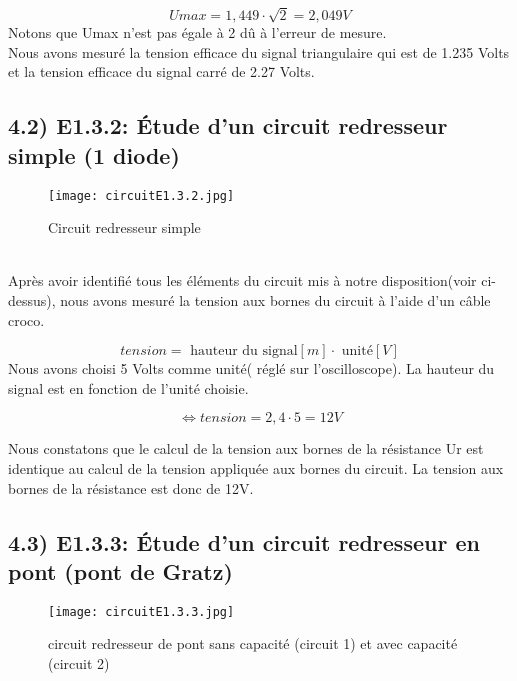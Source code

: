 \documentclass{report}
\begin{document}
\begin{equation}
   Umax = 1,449 \cdot \sqrt{2} = 2,049 V
\end{equation}
Notons que Umax n'est pas \'egale \`a 2 d\^u \`a l'erreur de mesure.
\\

Nous avons mesur\'e la tension efficace du signal triangulaire qui est de 1.235 Volts et la tension efficace du signal carr\'e de 2.27 Volts.

\subsection*{4.2) E1.3.2: \'Etude d'un circuit redresseur simple (1 diode)}
\hspace*{0.5cm}
\begin{figure}[ht!]
\centering
\texttt{[image: circuitE1.3.2.jpg]}
\caption{Circuit redresseur simple}
\label{overflow}
\end{figure}
\\
Apr\`es avoir identifi\'e tous les \'el\'ements du circuit mis \`a notre disposition(voir ci-dessus), nous avons mesur\'e la tension aux bornes du circuit \`a l'aide d'un c\^able croco.

\begin{equation}
   tension = \text{ hauteur du signal}[m] \cdot \text{ unit\'e}[V]
\end{equation}
Nous avons choisi 5 Volts comme unit\'e( r\'egl\'e sur l'oscilloscope). La hauteur du signal est en fonction de l'unit\'e choisie.

\begin{equation}
   \Leftrightarrow tension = 2,4 \cdot 5 = 12 V
\end{equation}

Nous constatons que le calcul de la tension aux bornes de la r\'esistance Ur est identique au calcul de la tension appliqu\'ee aux bornes du circuit. La tension aux bornes de la r\'esistance est donc de 12V.

\subsection*{4.3) E1.3.3: \'Etude d'un circuit redresseur en pont (pont de Gratz)}
\hspace*{0.5cm}
\begin{figure}[ht!]
\centering
\texttt{[image: circuitE1.3.3.jpg]}
\caption{circuit redresseur de pont sans capacit\'e (circuit 1) et avec capacit\'e (circuit 2)}
\label{overflow}
\end{figure}
\\
\end{document}

